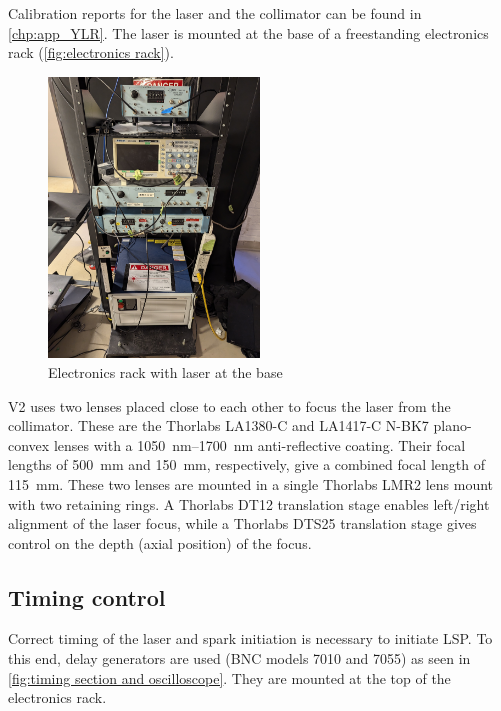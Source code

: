             Calibration reports for the laser and the collimator can be found in \autoref{chp:app_YLR}. The laser is mounted at the base of a freestanding electronics rack (\autoref{fig:electronics rack}).

            \begin{figure}[!ht]
                \centering
                \includegraphics[width=0.50\textwidth]{assets/3 design/Control rack.jpg}
                \caption{Electronics rack with laser at the base}
                \label{fig:electronics rack}
            \end{figure}

            V2 uses two lenses placed close to each other to focus the laser from the collimator. These are the Thorlabs LA1380-C and LA1417-C N-BK7 plano-convex lenses with a \qtyrange{1050}{1700}{nm} anti-reflective coating. Their focal lengths of \qty{500}{mm} and \qty{150}{mm}, respectively, give a combined focal length of \qty{115}{mm}. These two lenses are mounted in a single Thorlabs LMR2 lens mount with two retaining rings. A Thorlabs DT12 translation stage enables left/right alignment of the laser focus, while a Thorlabs DTS25 translation stage gives control on the depth (axial position) of the focus.

        \subsection{Timing control}

            Correct timing of the laser and spark initiation is necessary to initiate LSP. To this end, delay generators are used (BNC models 7010 and 7055) as seen in \autoref{fig:timing section and oscilloscope}. They are mounted at the top of the electronics rack.

